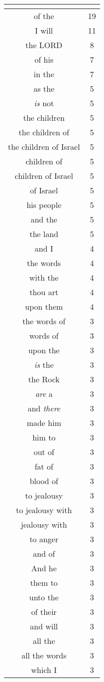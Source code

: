 \begin{center}
\begin{longtable}{|c|c|}
\hline \multicolumn{2}{c}{{ }} \\ \hline
\endfoot 
of the & 19\\ \hline 
I will & 11\\ \hline 
the LORD & 8\\ \hline 
of his & 7\\ \hline 
in the & 7\\ \hline 
as the & 5\\ \hline 
\emph{is} not & 5\\ \hline 
the children & 5\\ \hline 
the children of & 5\\ \hline 
the children of Israel & 5\\ \hline 
children of & 5\\ \hline 
children of Israel & 5\\ \hline 
of Israel & 5\\ \hline 
his people & 5\\ \hline 
and the & 5\\ \hline 
the land & 5\\ \hline 
and I & 4\\ \hline 
the words & 4\\ \hline 
with the & 4\\ \hline 
thou art & 4\\ \hline 
upon them & 4\\ \hline 
the words of & 3\\ \hline 
words of & 3\\ \hline 
upon the & 3\\ \hline 
\emph{is} the & 3\\ \hline 
the Rock & 3\\ \hline 
\emph{are} a & 3\\ \hline 
and \emph{there} & 3\\ \hline 
made him & 3\\ \hline 
him to & 3\\ \hline 
out of & 3\\ \hline 
fat of & 3\\ \hline 
blood of & 3\\ \hline 
to jealousy & 3\\ \hline 
to jealousy with & 3\\ \hline 
jealousy with & 3\\ \hline 
to anger & 3\\ \hline 
and of & 3\\ \hline 
And he & 3\\ \hline 
them to & 3\\ \hline 
unto the & 3\\ \hline 
of their & 3\\ \hline 
and will & 3\\ \hline 
all the & 3\\ \hline 
all the words & 3\\ \hline 
which I & 3\\ \hline 
\end{longtable}
\end{center}





